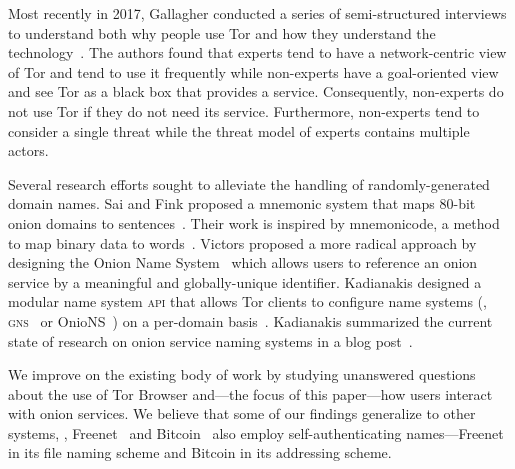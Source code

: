 Most recently in 2017, Gallagher \ea conducted a series of semi-structured
interviews to understand both why people use Tor and how they understand the
technology~\cite{Gallagher2017a}.  The authors found that experts tend to have a
network-centric view of Tor and tend to use it frequently while non-experts have
a goal-oriented view and see Tor as a black box that provides a service.
Consequently, non-experts do not use Tor if they do not need its service.
Furthermore, non-experts tend to consider a single threat while the threat model
of experts contains multiple actors.

Several research efforts sought to alleviate the handling of randomly-generated
domain names.  Sai and Fink proposed a mnemonic system that maps 80-bit onion
domains to sentences~\cite{Sai2012a}.  Their work is inspired by mnemonicode, a
method to map binary data to words~\cite{mnemonicode}.  Victors \ea proposed a
more radical approach by designing the Onion Name System~\cite{Victors2017a}
which allows users to reference an onion service by a meaningful and
globally-unique identifier.  Kadianakis \ea designed a modular name system
\textsc{api} that allows Tor clients to configure name systems (\eg,
\textsc{gns}~\cite{Schanzenbach2012a} or OnioNS~\cite{Victors2017a}) on a
per-domain basis~\cite{Kadianakis2016a}.  Kadianakis summarized the current
state of research on onion service naming systems in a blog
post~\cite{Kadianakis2017a}.

We improve on the existing body of work by studying unanswered questions about
the use of Tor Browser and---the focus of this paper---how users interact with
onion services.  We believe that some of our findings generalize to other
systems, \eg, Freenet~\cite{Freenet} and Bitcoin~\cite{Nakamoto2008a} also
employ self-authenticating names---Freenet in its file naming scheme and Bitcoin
in its addressing scheme.
